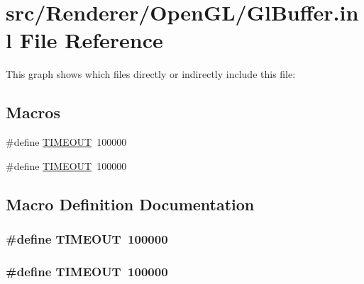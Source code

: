 \hypertarget{_gl_buffer_8inl}{\section{src/\+Renderer/\+Open\+G\+L/\+Gl\+Buffer.inl File Reference}
\label{_gl_buffer_8inl}
}
This graph shows which files directly or indirectly include this file\+:
\subsection*{Macros}
\begin{DoxyCompactItemize}
\item 
\#define \hyperlink{_gl_buffer_8h_a45ba202b05caf39795aeca91b0ae547e}{T\+I\+M\+E\+O\+U\+T}~100000
\item 
\#define \hyperlink{_gl_buffer_8inl_a45ba202b05caf39795aeca91b0ae547e}{T\+I\+M\+E\+O\+U\+T}~100000
\end{DoxyCompactItemize}


\subsection{Macro Definition Documentation}
\hypertarget{_gl_buffer_8h_a45ba202b05caf39795aeca91b0ae547e}{
\subsubsection[{T\+I\+M\+E\+O\+U\+T}]{\setlength{\rightskip}{0pt plus 5cm}\#define T\+I\+M\+E\+O\+U\+T~100000}}\label{_gl_buffer_8h_a45ba202b05caf39795aeca91b0ae547e}
\hypertarget{_gl_buffer_8inl_a45ba202b05caf39795aeca91b0ae547e}{
\subsubsection[{T\+I\+M\+E\+O\+U\+T}]{\setlength{\rightskip}{0pt plus 5cm}\#define T\+I\+M\+E\+O\+U\+T~100000}}\label{_gl_buffer_8inl_a45ba202b05caf39795aeca91b0ae547e}
